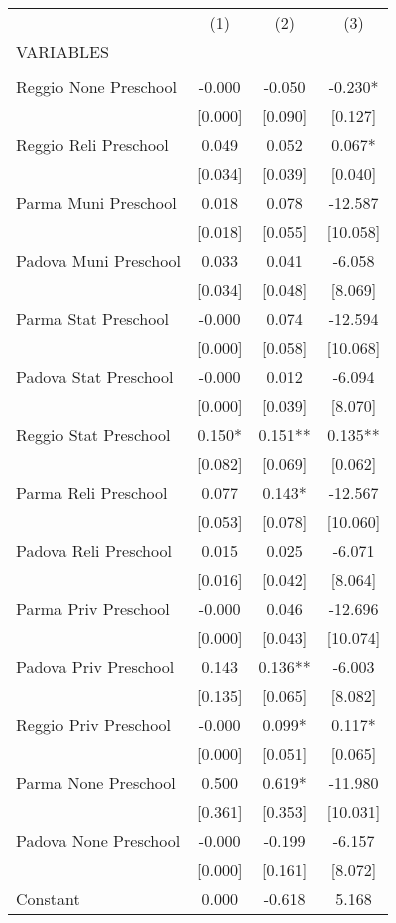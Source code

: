 \begin{tabular}{lccc} \hline
 & (1) & (2) & (3) \\
VARIABLES &  &  &  \\ \hline
 &  &  &  \\
Reggio None Preschool & -0.000 & -0.050 & -0.230* \\
 & [0.000] & [0.090] & [0.127] \\
Reggio Reli Preschool & 0.049 & 0.052 & 0.067* \\
 & [0.034] & [0.039] & [0.040] \\
Parma Muni Preschool & 0.018 & 0.078 & -12.587 \\
 & [0.018] & [0.055] & [10.058] \\
Padova Muni Preschool & 0.033 & 0.041 & -6.058 \\
 & [0.034] & [0.048] & [8.069] \\
Parma Stat Preschool & -0.000 & 0.074 & -12.594 \\
 & [0.000] & [0.058] & [10.068] \\
Padova Stat Preschool & -0.000 & 0.012 & -6.094 \\
 & [0.000] & [0.039] & [8.070] \\
Reggio Stat Preschool & 0.150* & 0.151** & 0.135** \\
 & [0.082] & [0.069] & [0.062] \\
Parma Reli Preschool & 0.077 & 0.143* & -12.567 \\
 & [0.053] & [0.078] & [10.060] \\
Padova Reli Preschool & 0.015 & 0.025 & -6.071 \\
 & [0.016] & [0.042] & [8.064] \\
Parma Priv Preschool & -0.000 & 0.046 & -12.696 \\
 & [0.000] & [0.043] & [10.074] \\
Padova Priv Preschool & 0.143 & 0.136** & -6.003 \\
 & [0.135] & [0.065] & [8.082] \\
Reggio Priv Preschool & -0.000 & 0.099* & 0.117* \\
 & [0.000] & [0.051] & [0.065] \\
Parma None Preschool & 0.500 & 0.619* & -11.980 \\
 & [0.361] & [0.353] & [10.031] \\
Padova None Preschool & -0.000 & -0.199 & -6.157 \\
 & [0.000] & [0.161] & [8.072] \\
Constant & 0.000 & -0.618 & 5.168 \\

\end{tabular}
